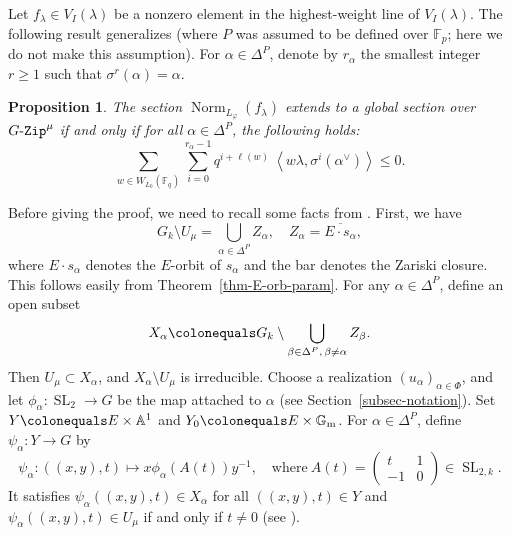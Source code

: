 \documentclass[11pt]{amsart}
\numberwithin{equation}{section}
\newtheorem{proposition}[theorem]{Proposition}
\theoremstyle{definition}
\theoremstyle{remark}
\newcommand{\GZip}{\mathop{\text{$G$-{\tt Zip}}}\nolimits}
\renewcommand{\AA}{\mathbb{A}}
\newcommand{\FF}{\mathbb{F}}
\newcommand{\GG}{\mathbb{G}}
\DeclareMathOperator{\SL}{SL}
\DeclareMathOperator{\Norm}{Norm}
\begin{document}
Let $f_\lambda\in V_I(\lambda)$ be a nonzero element in the highest-weight line of $V_I(\lambda)$. The following result generalizes \cite[Theorem 2]{Koskivirta-automforms-GZip} (where $P$ was assumed to be defined over $\FF_p$; here we do not make this assumption). For $\alpha\in \Delta^P$, denote by $r_\alpha$ the smallest integer $r\geq 1$ such that $\sigma^r(\alpha)=\alpha$.

\begin{proposition}\label{prop-Norm}
The section $\Norm_{L_\varphi}(f_\lambda)$ extends to a global section over $\GZip^\mu$ if and only if for all $\alpha \in \Delta^P$, the following holds:
\begin{equation}\label{formula-norm}
\sum_{w\in W_{L_0}(\FF_q)} \sum_{i=0}^{r_\alpha-1} q^{i+\ell(w)} \ \left\langle w\lambda, \sigma^i\left(\alpha^\vee\right) \right\rangle\leq 0.
\end{equation}
\end{proposition}

Before giving the proof, we need to recall some facts from \cite[Section~3.1]{Imai-Koskivirta-vector-bundles}. First, we have
\begin{equation}\label{GminusU}
    G_k \setminus U_{\mu} = \bigcup_{\alpha \in \Delta^P} Z_\alpha, \quad Z_\alpha=\overline{E\cdot s_\alpha}, 
\end{equation}
where $E\cdot s_\alpha$ denotes the $E$-orbit of $s_{\alpha}$ and the bar denotes the Zariski closure. This follows easily from Theorem~\ref{thm-E-orb-param}. For any $\alpha\in \Delta^P$, define an open subset 
\begin{equation}
X_\alpha  \colonequals  G_k \setminus \bigcup_{\beta\in \Delta^P,\, \beta\neq \alpha}Z_\beta.
\end{equation}
Then $U_{\mu}\subset X_\alpha$, and $X_{\alpha}\setminus U_{\mu}$ is irreducible. Choose a realization
$(u_{\alpha})_{\alpha \in \Phi}$, and let $\phi_{\alpha}\colon \SL_2\to G$ be the map attached to $\alpha$ (see Section~\ref{subsec-notation}). Set $Y\colonequals E \times \AA^1$ and $Y_0\colonequals E\times \GG_{\mathrm{m}}$. For $\alpha\in \Delta^P$, define $\psi_\alpha \colon Y \to G$ by
\begin{equation}\label{phia}
\psi_\alpha \colon ((x,y),t)\longmapsto x \phi_{\alpha} \left(A(t)\right)y^{-1}, \quad \textrm{where} \ A(t)=\left(
\begin{matrix}
t & 1 \\ -1 & 0 \end{matrix}
\right)\in \SL_{2,k}.
\end{equation}
It satisfies $\psi_\alpha((x,y),t)\in X_\alpha$ for all $((x,y),t)\in Y$ and $\psi_\alpha((x,y),t)\in U_\mu$ if and only if $t\neq 0 $ (see \cite[Proposition 3.1.4]{Imai-Koskivirta-vector-bundles}).
\end{document}
